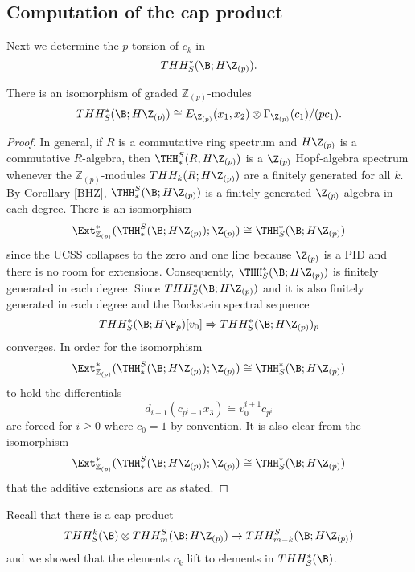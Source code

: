 \subsection{Computation of the cap product}
Next we determine the $p$-torsion of $c_k$ in 
\[THH_S^*(\B;H\Z_{(p)}).\] 
\begin{lem}
There is an isomorphism of graded $\mathbb{Z}_{(p)}$-modules
\[ THH_S^*(\B;H\Z_{(p)})\cong E_{\Z_{(p)}}(x_1,x_2)\otimes \Gamma_{\Z_{(p)}}(c_1)/(pc_1).\]
\end{lem}
\begin{proof}
In general, if $R$ is a commutative ring spectrum and $H\Z_{(p)}$ is a commutative $R$-algebra, then $\THH_*^S(R,H\Z_{(p)})$ is a $\Z_{(p)}$ Hopf-algebra spectrum whenever the $\mathbb{Z}_{(p)}$-modules $THH_k(R;H\Z_{(p)})$ are a finitely generated for all $k$. By Corollary \ref{BHZ}, $\THH_*^S(\B;H\Z_{(p)})$ is a finitely generated $\Z_{(p)}$-algebra in each degree. There is an isomorphism 
\[ \Ext_{\mathbb{Z}_{(p)}}^*( \THH_*^S(\B;H\Z_{(p)});\Z_{(p)}) \cong \THH_S^*(\B;H\Z_{(p)})\]  
since the UCSS collapses to the zero and one line because $\Z_{(p)}$ is a PID and there is no room for extensions. Consequently, $\THH_S^*(\B;H\Z_{(p)})$ is finitely generated in each degree. 
Since $THH_S^*(\B;H\Z_{(p)})$ and it is also finitely generated in each degree and the Bockstein spectral sequence 
\[ THH_S^*(\B;H\F_p)[v_0]\Rightarrow THH_S^*(\B;H\Z_{(p)})_p\]
converges. %
In order for the isomorphism 
\[ \Ext_{\mathbb{Z}_{(p)}}^*( \THH_*^S(\B;H\Z_{(p)});\Z_{(p)}) \cong \THH_S^*(\B;H\Z_{(p)})\]  
to hold the differentials
\[ d_{i+1}(c_{p^{i}-1}x_3) \dot{=} v_0^{i+1}c_{p^i}\]
are forced for $i\ge 0$ where $c_0=1$ by convention. It is also clear from the isomorphism 
\[ \Ext_{\mathbb{Z}_{(p)}}^*( \THH_*^S(\B;H\Z_{(p)});\Z_{(p)}) \cong \THH_S^*(\B;H\Z_{(p)})\] 
that the additive extensions are as stated. 
\end{proof}
Recall that there is a cap product 
\[ THH_S^k(\B)\otimes THH^S_m(\B;H\Z_{(p)})\rightarrow THH^S_{m-k}(\B;H\Z_{(p)})\]
and we showed that the elements $c_k$ lift to elements in $THH_S^*(\B)$. 

